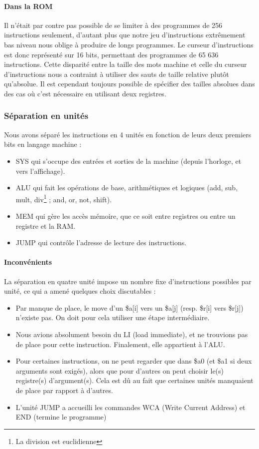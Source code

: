 \documentclass{article}
\begin{document}
\paragraph{Dans la ROM}
Il n'était par contre pas possible de se limiter à des programmes de 256 instructions
seulement, d'autant plus que notre jeu d'instructions extrêmement bas niveau nous
oblige à produire de longs programmes. Le curseur d'instructions est donc représenté
sur 16 bits, permettant des programmes de 65 636 instructions. Cette disparité
entre la taille des mots machine et celle du curseur d'instructions nous a contraint
à utiliser des sauts de taille relative plutôt qu'absolue. Il est cependant toujours
possible de spécifier des tailles absolues dans des cas où c'est nécessaire en
utilisant deux registres.

\subsubsection{Séparation en unités}
Nous avons séparé les instructions en 4 unités en fonction de leurs
deux premiers bits en langage machine :
\begin{itemize}
  \item SYS qui s'occupe des entrées et sorties de la machine (depuis
    l'horloge, et vers l'affichage).
  \item ALU qui fait les opérations de base, arithmétiques et logiques (add,
    sub, mult, div\footnote{La division est euclidienne} ; and, or, not, shift).
  \item MEM qui gère les accès mémoire, que ce soit entre registres ou entre un
  registre et la RAM.
  \item JUMP qui contrôle l'adresse de lecture des instructions.
\end{itemize}

\paragraph{Inconvénients}
La séparation en quatre unité impose un nombre fixe d'instructions possibles
par unité, ce qui a amené quelques choix discutables :
\begin{itemize}
  \item Par manque de place, le move d'un \$a[i] vers un \$a[j]
    (resp. \$r[i] vers \$r[j]) n'existe pas. On doit pour cela utiliser une
    étape intermédiaire.
  \item Nous avions absolument besoin du LI (load immediate), et ne trouvions
    pas de place pour cette instruction. Finalement, elle appartient à l'ALU.
  \item Pour certaines instructions, on ne peut regarder que dans \$a0 (et \$a1
    si deux arguments sont exigés), alors que pour d'autres on peut choisir
    le(s) registre(s) d'argument(s). Cela est dû au fait que certaines unités
    manquaient de place par rapport à d'autres.
  \item L'unité JUMP a accueilli les commandes WCA (Write Current Address) et
    END (termine le programme)
\end{itemize}
\end{document}
